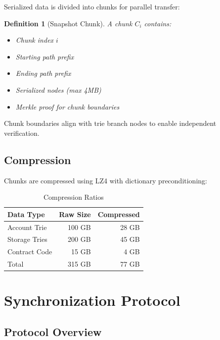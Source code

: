 \documentclass[11pt,a4paper]{article}
\newtheorem{definition}{Definition}
\begin{document}
Serialized data is divided into chunks for parallel transfer:

\begin{definition}[Snapshot Chunk]
A chunk $C_i$ contains:
\begin{itemize}
    \item Chunk index $i$
    \item Starting path prefix
    \item Ending path prefix
    \item Serialized nodes (max 4MB)
    \item Merkle proof for chunk boundaries
\end{itemize}
\end{definition}

Chunk boundaries align with trie branch nodes to enable independent verification.

\subsection{Compression}

Chunks are compressed using LZ4 with dictionary preconditioning:

\begin{table}[htbp]
\centering
\caption{Compression Ratios}
\begin{tabular}{lrr}
\toprule
\textbf{Data Type} & \textbf{Raw Size} & \textbf{Compressed} \\
\midrule
Account Trie & 100 GB & 28 GB \\
Storage Tries & 200 GB & 45 GB \\
Contract Code & 15 GB & 4 GB \\
\midrule
Total & 315 GB & 77 GB \\
\bottomrule
\end{tabular}
\label{tab:compression}
\end{table}

\section{Synchronization Protocol}

\subsection{Protocol Overview}
\end{document}

